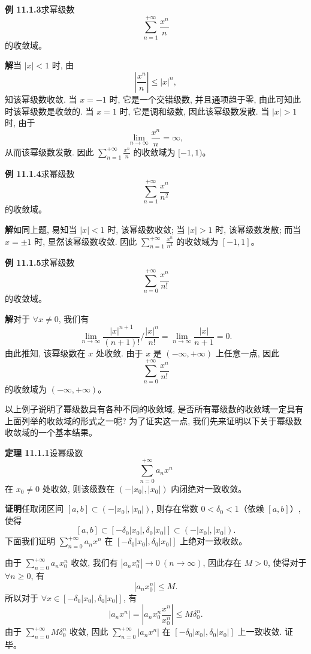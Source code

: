 \documentclass[UTF8, 12pt, fontset=fandol, oneside]{ctexart}
\begin{document}
\noindent\textbf{例 11.1.3}\quad 求幂级数
\[
  \sum_{n=1}^{+\infty}\frac{x^n}{n}
\]
的收敛域。

\noindent\textbf{解}\quad 当 $|x|<1$ 时, 由
\[
  \left|\frac{x^n}{n}\right|\leqslant |x|^n,
\]
知该幂级数收敛. 当 $x=-1$ 时, 它是一个交错级数, 并且通项趋于零, 由此可知此时该幂级数是收敛的. 当 $x=1$ 时, 它是调和级数, 因此该幂级数发散. 当 $|x|>1$ 时, 由于
\[
  \lim_{n\to\infty}\frac{x^n}{n}=\infty,
\]
从而该幂级数发散. 因此 $\sum_{n=1}^{+\infty}\frac{x^n}{n}$ 的收敛域为 $[-1,1)$。

\noindent\textbf{例 11.1.4}\quad 求幂级数
\[
  \sum_{n=1}^{+\infty}\frac{x^n}{n^2}
\]
的收敛域。

\noindent\textbf{解}\quad 如同上题, 易知当 $|x|<1$ 时, 该幂级数收敛; 当 $|x|>1$ 时, 该幂级数发散; 而当 $x=\pm1$ 时, 显然该幂级数收敛. 因此 $\sum_{n=1}^{+\infty}\frac{x^n}{n^2}$ 的收敛域为 $[-1,1]$。

\noindent\textbf{例 11.1.5}\quad 求幂级数
\[
  \sum_{n=0}^{+\infty}\frac{x^n}{n!}
\]
的收敛域。

\noindent\textbf{解}\quad 对于 $\forall x\ne0$, 我们有
\[
  \lim_{n\to\infty}
  \frac{|x|^{n+1}}{(n+1)!}\Big/\frac{|x|^n}{n!}
  =
  \lim_{n\to\infty}\frac{|x|}{n+1}=0.
\]
由此推知, 该幂级数在 $x$ 处收敛. 由于 $x$ 是 $(-\infty,+\infty)$ 上任意一点, 因此
\[
  \sum_{n=0}^{+\infty}\frac{x^n}{n!}
\]
的收敛域为 $(-\infty,+\infty)$。

以上例子说明了幂级数具有各种不同的收敛域, 是否所有幂级数的收敛域一定具有上面列举的收敛域的形式之一呢? 为了证实这一点, 我们先来证明以下关于幂级数收敛域的一个基本结果。

\noindent\textbf{定理 11.1.1}\quad 设幂级数
\[
  \sum_{n=0}^{+\infty}a_nx^n
\]
在 $x_0\ne0$ 处收敛, 则该级数在 $(-|x_0|,|x_0|)$ 内闭绝对一致收敛。

\noindent\textbf{证明}\quad 任取闭区间 $[a,b]\subset(-|x_0|,|x_0|)$, 则存在常数 $0<\delta_0<1$（依赖 $[a,b]$）, 使得
\[
  [a,b]\subset[-\delta_0|x_0|,\delta_0|x_0|]\subset(-|x_0|,|x_0|).
\]
下面我们证明 $\sum_{n=0}^{+\infty}a_nx^n$ 在 $[-\delta_0|x_0|,\delta_0|x_0|]$ 上绝对一致收敛。

由于 $\sum_{n=0}^{+\infty}a_nx_0^n$ 收敛, 我们有 $|a_nx_0^n|\to0\ (n\to\infty)$, 因此存在 $M>0$, 使得对于 $\forall n\geqslant0$, 有
\[
  |a_nx_0^n|\leqslant M.
\]
所以对于 $\forall x\in[-\delta_0|x_0|,\delta_0|x_0|]$, 有
\[
  |a_nx^n|
  =
  \left|a_nx_0^n\frac{x^n}{x_0^n}\right|
  \leqslant M\delta_0^n.
\]
由于 $\sum_{n=0}^{+\infty}M\delta_0^n$ 收敛, 因此 $\sum_{n=0}^{+\infty}|a_nx^n|$ 在 $[-\delta_0|x_0|,\delta_0|x_0|]$ 上一致收敛. 证毕。
\end{document}
